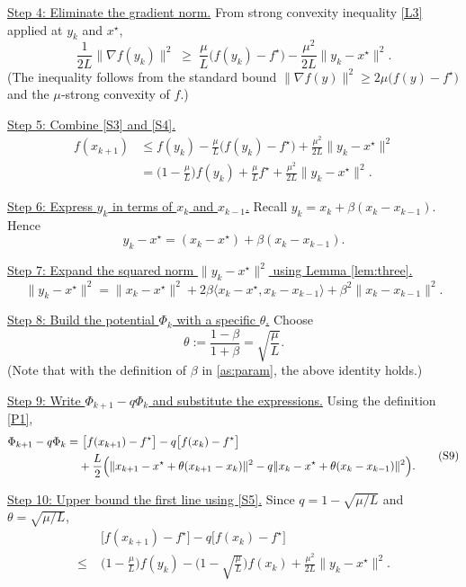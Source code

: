 \documentclass{article}
\begin{document}
\noindent\underline{Step 4: Eliminate the gradient norm.}  
From strong convexity inequality \eqref{L3} applied at $y_k$ and $x^\star$,
\[
\frac{1}{2L}\|\nabla f(y_k)\|^2 \;\ge\;
\frac{\mu}{L}\bigl(f(y_k)-f^\star\bigr) 
    -\frac{\mu^2}{2L}\|y_k-x^\star\|^2 .
\tag{S4}
\]
(The inequality follows from the standard bound
$\|\nabla f(y)\|^2\ge 2\mu\bigl(f(y)-f^\star\bigr)$ and the
$\mu$‑strong convexity of $f$.)

\noindent\underline{Step 5: Combine \eqref{S3} and \eqref{S4}.}  
\[
\begin{aligned}
f(x_{k+1}) 
&\le f(y_k) -\frac{\mu}{L}\bigl(f(y_k)-f^\star\bigr)
      +\frac{\mu^2}{2L}\|y_k-x^\star\|^2\\[2pt]
&= \bigl(1-\tfrac{\mu}{L}\bigr)f(y_k) + \tfrac{\mu}{L}f^\star
    +\frac{\mu^2}{2L}\|y_k-x^\star\|^2 .
\end{aligned}
\tag{S5}
\]

\noindent\underline{Step 6: Express $y_k$ in terms of $x_k$ and $x_{k-1}$.}  
Recall $y_k = x_k + \beta (x_k-x_{k-1})$. Hence
\[
y_k - x^\star = (x_k-x^\star) + \beta (x_k-x_{k-1}).
\tag{S6}
\]

\noindent\underline{Step 7: Expand the squared norm $\|y_k-x^\star\|^2$ using Lemma \ref{lem:three}.}  
\[
\|y_k-x^\star\|^2 
= \|x_k-x^\star\|^2 + 2\beta\langle x_k-x^\star, x_k-x_{k-1}\rangle
  + \beta^2\|x_k-x_{k-1}\|^2 .
\tag{S7}
\]

\noindent\underline{Step 8: Build the potential $\Phi_k$ with a specific $\theta$.}  
Choose
\[
\theta := \frac{1-\beta}{1+\beta} = \sqrt{\frac{\mu}{L}} .
\tag{S8}
\]
(Note that with the definition of $\beta$ in \eqref{as:param}, the above identity holds.)

\noindent\underline{Step 9: Write $\Phi_{k+1}-q\Phi_k$ and substitute the expressions.}  
Using the definition \eqref{P1},
\[
\begin{aligned}
\Phi_{k+1} - q\Phi_k
=&\ \bigl[f(x_{k+1})-f^\star\bigr] 
   - q\bigl[f(x_k)-f^\star\bigr] \\
 &+ \frac{L}{2}\Bigl(
      \|x_{k+1}-x^\star+\theta (x_{k+1}-x_k)\|^2
      - q\|x_k-x^\star+\theta (x_k-x_{k-1})\|^2
   \Bigr).
\end{aligned}
\tag{S9}
\]

\noindent\underline{Step 10: Upper bound the first line using \eqref{S5}.}  
Since $q = 1-\sqrt{\mu/L}$ and $\theta = \sqrt{\mu/L}$,
\[
\begin{aligned}
&\bigl[f(x_{k+1})-f^\star\bigr] - q\bigl[f(x_k)-f^\star\bigr] \\
\le\;& \bigl(1-\tfrac{\mu}{L}\bigr)f(y_k)-\bigl(1-\sqrt{\tfrac{\mu}{L}}\bigr)f(x_k)
      +\frac{\mu^2}{2L}\|y_k-x^\star\|^2 .
\end{aligned}
\tag{S10}
\]
\end{document}
